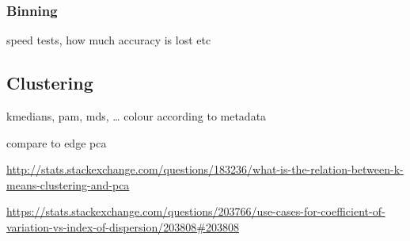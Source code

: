 \subsubsection{Binning}
\label{sec:Evaluation:sub:DistanceMeasures:sub:Binning}

speed tests, how much accuracy is lost etc


\subsection{Clustering}
\label{sec:Postprocessing:sub:Clustering}

kmedians, pam, mds, … colour according to metadata

compare to edge pca

\url{http://stats.stackexchange.com/questions/183236/what-is-the-relation-between-k-means-clustering-and-pca}

\url{https://stats.stackexchange.com/questions/203766/use-cases-for-coefficient-of-variation-vs-index-of-dispersion/203808#203808}



